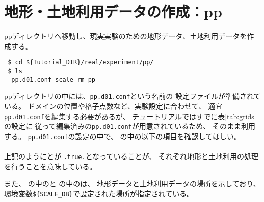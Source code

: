 \section{地形・土地利用データの作成：pp} \label{sec:tutrial_real_pp}

ppディレクトリへ移動し、現実実験のための地形データ、土地利用データを作成する。
\begin{verbatim}
 $ cd ${Tutorial_DIR}/real/experiment/pp/
 $ ls 
  pp.d01.conf scale-rm_pp
\end{verbatim}
ppディレクトリの中には、\verb|pp.d01.conf|という名前の
設定ファイルが準備されている。
ドメインの位置や格子点数など、実験設定に合わせて、
適宜\verb|pp.d01.conf|を編集する必要があるが、
チュートリアルではすでに表\ref{tab:grids}の設定に
従って編集済みの\verb|pp.d01.conf|が用意されているため、
そのまま利用する。
\verb|pp.d01.conf|の設定の中で、
の中の以下の項目を確認してほしい。\\

\\

\noindent 上記のようにとが
\verb|.true.|となっていることが、
それぞれ地形と土地利用の処理を行うことを意味している。

また、
の中のと
の中のは、
地形データと土地利用データの場所を示しており、
環境変数\verb|${SCALE_DB}|で設定された場所が指定されている。\\

\\
\\


